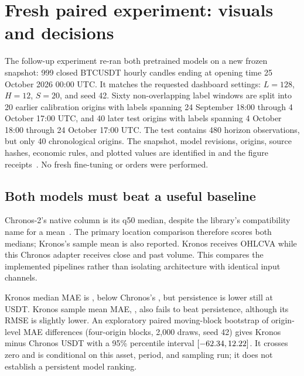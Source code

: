 \FloatBarrier
\clearpage
\section{Fresh paired experiment: visuals and decisions}\label{sec:fresh}
The follow-up experiment re-ran both pretrained models on a new frozen snapshot:
999 closed BTCUSDT hourly candles ending at opening time 25 October 2026 00:00
UTC. It matches the requested dashboard settings: $L=128$, $H=12$, $S=20$,
and seed 42. Sixty non-overlapping label windows are split into 20 earlier
calibration origins with labels spanning 24 September 18:00 through 4 October
17:00 UTC, and 40 later test origins with labels spanning 4 October 18:00
through 24 October 17:00 UTC. The test
contains 480 horizon observations, but only 40 chronological origins. The
snapshot, model revisions, origins, source hashes, economic rules, and plotted
values are identified in  and
the figure receipts~\cite{fresh}. No fresh fine-tuning or orders were performed.

\subsection{Both models must beat a useful baseline}
Chronos-2's native  column is its q50 median, despite the
library's compatibility name for a mean~\cite{chronosmedian}. The primary
location comparison therefore scores both medians; Kronos's sample mean is
also reported. Kronos receives OHLCVA while this Chronos adapter receives close
and past volume. This compares the implemented pipelines rather than isolating
architecture with identical input channels.

\begin{table}[htbp]\centering\small

\caption{Fresh 40-origin held-out point scores. MAE/RMSE are USDT; terminal
direction has 40 observations. Persistence predicts the separate flat class.}
\label{tab:fresh-point}
\end{table}
Kronos median MAE is \FreshKMedianMAE{}, below Chronos's \FreshCMedianMAE{},
but persistence is lower still at \FreshBaselineMAE{} USDT. Kronos sample mean
MAE, \FreshKMeanMAE{}, also fails to beat persistence, although its RMSE is
slightly lower. An exploratory paired moving-block bootstrap of origin-level
MAE differences (four-origin blocks, 2,000 draws, seed 42) gives Kronos minus
Chronos \FreshBootstrapDifference{} USDT with a 95\% percentile interval
$[-62.34{},12.22{}]$. It crosses zero and is
conditional on this asset, period, and sampling run; it does not establish a
persistent model ranking.

